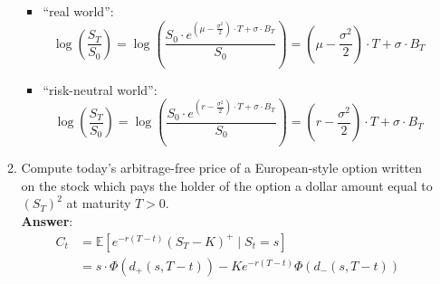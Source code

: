 \documentclass{article}
\begin{document}
\begin{enumerate}
\begin{enumerate}
\begin{itemize}
                              \item ``real world'': \[\log\left(\frac{S_T}{S_0}\right)=\log\left(\frac{S_0\cdot e^{(\mu-\frac{\sigma^2}{2})\cdot T+\sigma\cdot B_T}}{S_0}\right)=(\mu-\frac{\sigma^2}{2})\cdot T+\sigma\cdot B_T\]
                              \item ``risk-neutral world'': \[\log\left(\frac{S_T}{S_0}\right)=\log\left(\frac{S_0\cdot e^{(r-\frac{\sigma^2}{2})\cdot T+\sigma\cdot B_T}}{S_0}\right)=(r-\frac{\sigma^2}{2})\cdot T+\sigma\cdot B_T\]
                        \end{itemize}
                  \item Compute today's arbitrage-free price of a European-style option written on the stock which pays the holder of the option a dollar amount equal to $(S_T)^2$ at maturity $T>0$.\\
                        \textbf{Answer}: \begin{align*}
                              C_t & =\mathbb{E}[e^{-r(T-t)}(S_T-K)^+\mid S_t=s]          \\
                                  & =s\cdot\Phi(d_+(s,T-t))-Ke^{-r(T-t)}\Phi(d_-(s,T-t))
                        \end{align*}
            \end{enumerate}
\end{enumerate}
\end{document}

